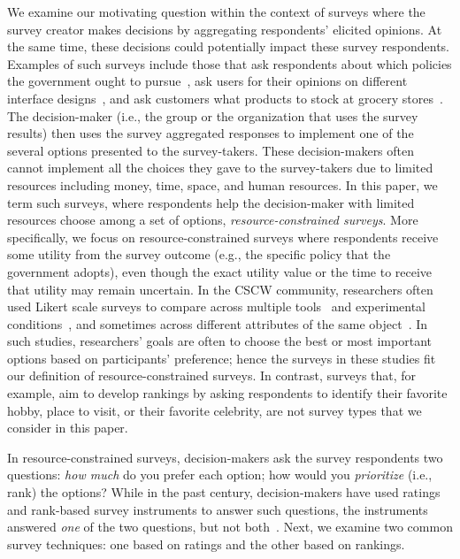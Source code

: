 {{We examine our motivating question within the context of surveys where the survey creator makes decisions by aggregating respondents' elicited opinions. At the same time, these decisions could potentially impact these survey respondents. Examples of such surveys include those that ask respondents about which policies the government ought to pursue~\cite{pew_spending}, ask users for their opinions on different interface designs~\cite{ledo2018evaluation}, and ask customers what products to stock at grocery stores~\cite{nielsen}. The decision-maker (i.e., the group or the organization that uses the survey results) then uses the survey aggregated responses to implement one of the several options presented to the survey-takers. These decision-makers often cannot implement all the choices they gave to the survey-takers due to limited resources including money, time, space, and human resources. In this paper, we term such surveys, where respondents help the decision-maker with limited resources choose among a set of options, \textit{resource-constrained surveys}. More specifically, we focus on resource-constrained surveys where respondents receive some utility from the survey outcome (e.g., the specific policy that the government adopts), even though the exact utility value or the time to receive that utility may remain uncertain. In the CSCW community, researchers often used Likert scale surveys to compare across multiple tools~\cite{zhang2017wikum} and experimental conditions~\cite{chang2017alpharead}, and sometimes across different attributes of the same object~\cite{cheng2017anyone, ma2017video}. In such studies, researchers' goals are often to choose the best or most important options based on participants' preference; hence the surveys in these studies fit our definition of resource-constrained surveys. In contrast, surveys that, for example, aim to develop rankings by asking respondents to identify their favorite hobby, place to visit, or their favorite celebrity, are not survey types that we consider in this paper. 

In resource-constrained surveys, decision-makers ask the survey respondents two questions: \textit{how much} do you prefer each option; how would you \textit{prioritize} (i.e., rank) the options? While in the past century, decision-makers have used ratings and rank-based survey instruments to answer such questions, the instruments answered \emph{one} of the two questions, but not both~\cite{moors2016two}.  Next, we examine two common survey techniques: one based on ratings and the other based on rankings.

}}
